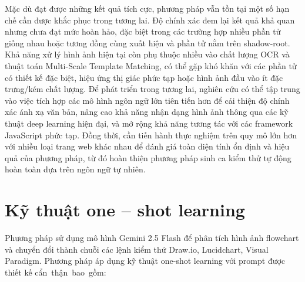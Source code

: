 \documentclass[a4paper, 12pt]{report}
\begin{document}
{Mặc dù đạt được những kết quả tích cực, phương pháp vẫn tồn tại một số hạn chế cần được khắc phục trong tương lai. Độ chính xác đem lại kết quả khả quan nhưng chưa đạt mức hoàn hảo, đặc biệt trong các trường hợp nhiều phần tử giống nhau hoặc tương đồng cùng xuất hiện và phần tử nằm trên shadow-root. Khả năng xử lý hình ảnh hiện tại còn phụ thuộc nhiều vào chất lượng OCR và thuật toán Multi-Scale Template Matching, có thể gặp khó khăn với các phần tử có thiết kế đặc biệt, hiệu ứng thị giác phức tạp hoặc hình ảnh đầu vào ít đặc trưng/kém chất lượng. Để phát triển trong tương lai, nghiên cứu có thể tập trung vào việc tích hợp các mô hình ngôn ngữ lớn tiên tiến hơn để cải thiện độ chính xác ánh xạ văn bản, nâng cao khả năng nhận dạng hình ảnh thông qua các kỹ thuật deep learning hiện đại, và mở rộng khả năng tương tác với các framework JavaScript phức tạp. Đồng thời, cần tiến hành thực nghiệm trên quy mô lớn hơn với nhiều loại trang web khác nhau để đánh giá toàn diện tính ổn định và hiệu quả của phương pháp, từ đó hoàn thiện phương pháp sinh ca kiểm thử tự động hoàn toàn dựa trên ngôn ngữ tự nhiên.


\printglossary[title={Danh mục thuật ngữ}]



\renewcommand\refname{Tài liệu tham khảo}






\appendix
\chapter{Kỹ thuật one -- shot learning}
\label{appendix:flowchart}


Phương pháp sử dụng mô hình Gemini 2.5 Flash \cite{google_gemini_2_5_flash} để phân tích hình ảnh flowchart và chuyển đổi thành chuỗi các lệnh kiểm thử Draw.io, Lucidchart, Visual Paradigm. Phương pháp áp dụng kỹ thuật one-shot learning với prompt được thiết kế cẩn~thận~bao~gồm:

}
\end{document}
